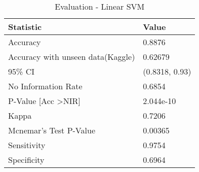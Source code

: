 \documentclass[a4paper,10pt]{report}\usepackage[]{graphicx}\usepackage[]{color}
\begin{document}
\begin{table}
    \begin{tabular}{|l|l|}
    \hline
    Statistic              & Value           \\ \hline
    Accuracy               & 0.8876          \\
    Accuracy with unseen data(Kaggle)               & 0.62679 \\ 
    95\% CI                & (0.8318, 0.93) \\
    No Information Rate    & 0.6854          \\
    P-Value [Acc \textgreater NIR]    &  2.044e-10      \\
    Kappa                  &  0.7206         \\
    Mcnemar's Test P-Value & 0.00365          \\
    Sensitivity            &  0.9754         \\
    Specificity            & 0.6964          \\ \hline
    \end{tabular}
    \caption{Evaluation - Linear SVM}
\end{table}
\end{document}
